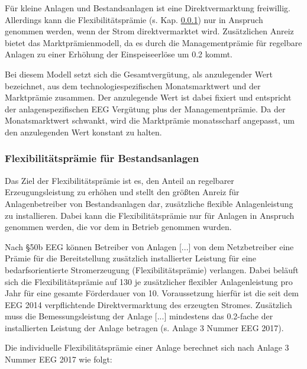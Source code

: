 Für kleine Anlagen und Bestandsanlagen ist eine Direktvermarktung freiwillig. Allerdings kann die Flexibilitätsprämie (s. Kap. \ref{chap:law_FP}) nur in Anspruch genommen werden, wenn der Strom direktvermarktet wird. Zusätzlichen Anreiz bietet das Marktprämienmodell, da es durch die Managementprämie für regelbare Anlagen zu einer Erhöhung der Einspeiseerlöse um \SI[per-mode=symbol]{0.2}{\ctkwh} kommt.\smallskip

Bei diesem Modell setzt sich die Gesamtvergütung, als anzulegender Wert bezeichnet, aus dem technologiespezifischen Monatsmarktwert und der Marktprämie zusammen. Der anzulegende Wert ist dabei fixiert und entspricht der anlagenspezifischen \gls{EEG} Vergütung plus der Managementprämie. Da der Monatsmarktwert schwankt, wird die Marktprämie monatsscharf angepasst, um den anzulegenden Wert konstant zu halten. \parencite{NKGH-DV}


\subsubsection{Flexibilitätsprämie für Bestandsanlagen}\label{chap:law_FP}

Das Ziel der Flexibilitätsprämie ist es, den Anteil an regelbarer Erzeugungsleistung zu erhöhen und stellt den größten Anreiz für Anlagenbetreiber von Bestandsanlagen dar, zusätzliche flexible Anlagenleistung zu installieren. Dabei kann die Flexibilitätsprämie nur für Anlagen in Anspruch genommen werden, die vor dem  in Betrieb genommen wurden.\smallskip

Nach \S 50b \gls{EEG} können \glqq Betreiber von Anlagen [...] von dem Netzbetreiber eine Prämie für die Bereitstellung zusätzlich installierter Leistung für eine bedarfsorientierte Stromerzeugung (Flexibilitätsprämie) verlangen.\grqq{} Dabei beläuft sich die Flexibilitätsprämie auf \SI{130}{\sieuro} je \si{\kw} zusätzlicher flexibler Anlagenleistung pro Jahr für eine gesamte Förderdauer von \SI{10}{\Jahren}. Voraussetzung hierfür ist die seit dem \gls{EEG} \SI{2014}{\relax} verpflichtende Direktvermarktung des erzeugten Stromes. Zusätzlich muss \glqq{}die Bemessungsleistung der Anlage [...] mindestens das \SI{0.2}{\relax}-fache der installierten Leistung der Anlage\grqq{} betragen (s. Anlage 3 Nummer  \gls{EEG} \SI{2017}{\relax}). \parencite{BJV2014} \parencite{DanielGromke2019}\smallskip

Die individuelle Flexibilitätsprämie einer Anlage berechnet sich nach Anlage 3 Nummer  \gls{EEG} \SI{2017}{\relax} wie folgt:

